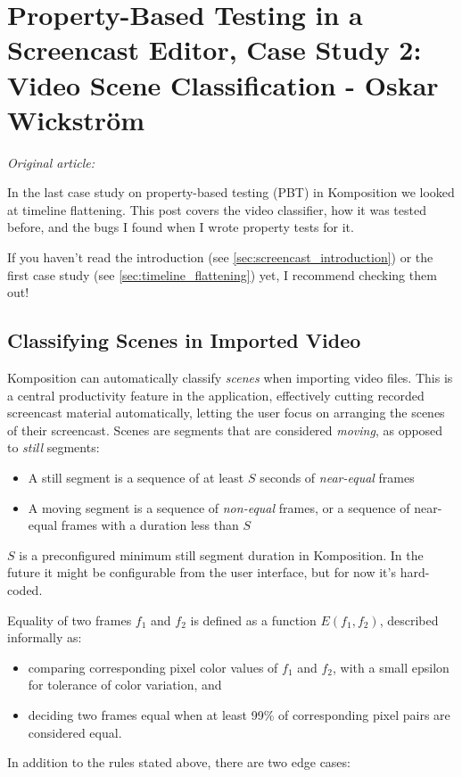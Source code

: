 \chapter{Property-Based Testing in a Screencast Editor, Case Study 2: Video Scene Classification - Oskar Wickstr\"om}
\label{sec:video_scene_classification}

\vspace{\baselineskip}
\noindent\textit{Original article: \cite{video_scene_classification}}
\vspace{\baselineskip}

\noindent In the last case study on property-based testing (PBT) in Komposition we looked at timeline flattening. This post covers the video classifier, how it was tested before, and the bugs I found when I wrote property tests for it.

If you haven't read the introduction (see \ref{sec:screencast_introduction}) or the first case study (see \ref{sec:timeline_flattening}) yet, I recommend checking them out!

\section{Classifying Scenes in Imported Video}


Komposition can automatically classify \textit{scenes} when importing video files. This is a central productivity feature in the application, effectively cutting recorded screencast material automatically, letting the user focus on arranging the scenes of their screencast. Scenes are segments that are considered \textit{moving}, as opposed to \textit{still} segments:

\begin{itemize}
\item A still segment is a sequence of at least $S$ seconds of \textit{near-equal} frames
\item A moving segment is a sequence of \textit{non-equal} frames, or a sequence of near-equal frames with a duration less than $S$
\end{itemize}
$S$ is a preconfigured minimum still segment duration in Komposition. In the future it might be configurable from the user interface, but for now it's hard-coded.

Equality of two frames $f_1$ and $f_2$ is defined as a function $E(f_1,f_2)$, described informally as:

\begin{itemize}
\item comparing corresponding pixel color values of $f_1$  and $f_2$, with a small epsilon for tolerance of color variation, and
\item deciding two frames equal when at least 99\% of corresponding pixel pairs are considered equal.                                                                                              \end{itemize}
In addition to the rules stated above, there are two edge cases:


